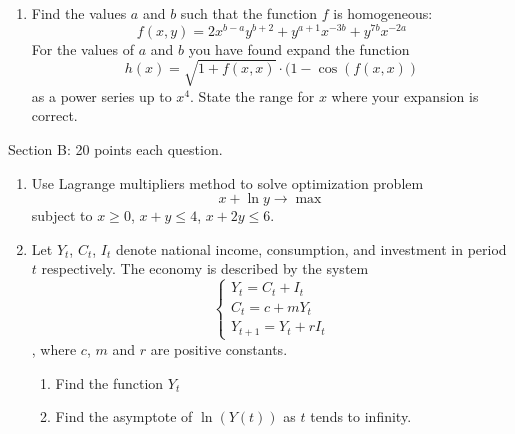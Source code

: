 \begin{enumerate}

\item Find the values $a$ and $b$ such that the function $f$ is homogeneous:
\[f(x,y)=2x^{b-a}y^{b+2}+y^{a+1}x^{-3b}+y^{7b}x^{-2a}\]
For the values of $a$ and $b$ you have found expand the function \[h(x)=\sqrt{1+f(x,x)}\cdot (1-\cos(f(x,x))\] as a power series up to $x^4$. State the range for $x$  where your expansion is correct.

\end{enumerate}


Section B: 20 points each question.
\begin{enumerate}

\item Use Lagrange multipliers method to solve optimization problem
\[x+\ln y\to \max\]
subject to
$x\geq 0$, $x+y\leq 4$, $x+2y\leq 6$.

\item Let $Y_t$, $C_t$, $I_t$ denote national income, consumption, and investment in period $t$ respectively. The economy is described by the system
\begin{equation}
\left\{
\begin{array}{l}
Y_t=C_t+I_t\\
C_t=c+mY_t\\
Y_{t+1}=Y_{t}+rI_t
\end{array}
\right.
\end{equation},
where $c$, $m$ and $r$ are positive constants.
\begin{enumerate}
\item Find the function $Y_t$
\item Find the asymptote of $\ln(Y(t))$ as $t$ tends to infinity.
\end{enumerate}


\end{enumerate}



